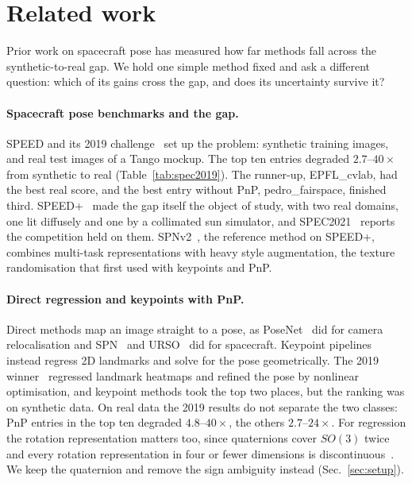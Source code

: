 \documentclass{article}
\begin{document}
\section{Related work}
\label{sec:related}

Prior work on spacecraft pose has measured how far methods fall across the synthetic-to-real
gap. We hold one simple method fixed and ask a different question: which of its gains cross
the gap, and does its uncertainty survive it?

\paragraph{Spacecraft pose benchmarks and the gap.} SPEED and its 2019
challenge~\citep{kisantal2020speed} set up the problem: synthetic training images, and real
test images of a Tango mockup. The top ten entries degraded $2.7$--$40\times$ from synthetic
to real (Table~\ref{tab:spec2019}). The runner-up, EPFL\_cvlab, had the best real score, and
the best entry without PnP, pedro\_fairspace, finished third. SPEED+~\citep{park2022speedplus}
made the gap itself the object of study, with two real domains, one lit diffusely and one by
a collimated sun simulator, and SPEC2021~\citep{park2023spec2021} reports the competition held
on them. SPNv2~\citep{park2024spnv2}, the reference method on SPEED+, combines multi-task
representations with heavy style augmentation, the texture randomisation that
\citet{park2019towards} first used with keypoints and PnP.



\paragraph{Direct regression and keypoints with PnP.} Direct methods map an image straight to
a pose, as PoseNet~\citep{kendall2015posenet} did for camera relocalisation and
SPN~\citep{sharma2020spn} and URSO~\citep{proenca2020urso} did for spacecraft. Keypoint
pipelines instead regress 2D landmarks and solve for the pose geometrically. The 2019
winner~\citep{chen2019landmark} regressed landmark heatmaps and refined the pose by nonlinear
optimisation, and keypoint methods took the top two places, but the ranking was on synthetic
data. On real data the 2019 results do not separate the two classes: PnP entries in the top
ten degraded $4.8$--$40\times$, the others $2.7$--$24\times$. For regression the rotation
representation matters too, since quaternions cover $SO(3)$ twice and every rotation
representation in four or fewer dimensions is discontinuous~\citep{zhou2019continuity}. We
keep the quaternion and remove the sign ambiguity instead (Sec.~\ref{sec:setup}).
\end{document}
